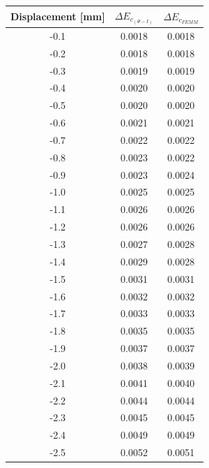 \documentclass[a4paper]{IEEEtran}
\begin{document}
    \begin{table}[ht]
        \centering
        \begin{tabular}{@{}ccc@{}}
            \toprule
            Displacement {[}mm{]} & $\Delta E_{c_{(\Psi-I)}}$  & $\Delta E_{c_{FEMM}}$   \\ \midrule
            -0.1                  & 0.0018 & 0.0018 \\
            -0.2                  & 0.0018 & 0.0018 \\
            -0.3                  & 0.0019 & 0.0019 \\
            -0.4                  & 0.0020 & 0.0020 \\
            -0.5                  & 0.0020 & 0.0020 \\
            -0.6                  & 0.0021 & 0.0021 \\
            -0.7                  & 0.0022 & 0.0022 \\
            -0.8                  & 0.0023 & 0.0022 \\
            -0.9                  & 0.0023 & 0.0024 \\
            -1.0                  & 0.0025 & 0.0025 \\
            -1.1                  & 0.0026 & 0.0026 \\
            -1.2                  & 0.0026 & 0.0026 \\
            -1.3                  & 0.0027 & 0.0028 \\
            -1.4                  & 0.0029 & 0.0028 \\
            -1.5                  & 0.0031 & 0.0031 \\
            -1.6                  & 0.0032 & 0.0032 \\
            -1.7                  & 0.0033 & 0.0033 \\
            -1.8                  & 0.0035 & 0.0035 \\
            -1.9                  & 0.0037 & 0.0037 \\
            -2.0                  & 0.0038 & 0.0039 \\
            -2.1                  & 0.0041 & 0.0040 \\
            -2.2                  & 0.0044 & 0.0044 \\
            -2.3                  & 0.0045 & 0.0045 \\
            -2.4                  & 0.0049 & 0.0049 \\
            -2.5                  & 0.0052 & 0.0051 \\

\end{tabular}
\end{table}
\end{document}
